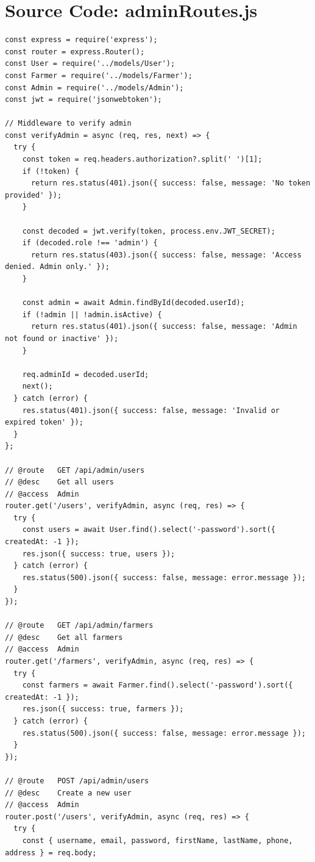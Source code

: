 \documentclass[12pt,a4paper]{report}
\begin{document}
\clearpage
\section{Source Code: adminRoutes.js}
\begin{lstlisting}
const express = require('express');
const router = express.Router();
const User = require('../models/User');
const Farmer = require('../models/Farmer');
const Admin = require('../models/Admin');
const jwt = require('jsonwebtoken');

// Middleware to verify admin
const verifyAdmin = async (req, res, next) => {
  try {
    const token = req.headers.authorization?.split(' ')[1];
    if (!token) {
      return res.status(401).json({ success: false, message: 'No token provided' });
    }

    const decoded = jwt.verify(token, process.env.JWT_SECRET);
    if (decoded.role !== 'admin') {
      return res.status(403).json({ success: false, message: 'Access denied. Admin only.' });
    }

    const admin = await Admin.findById(decoded.userId);
    if (!admin || !admin.isActive) {
      return res.status(401).json({ success: false, message: 'Admin not found or inactive' });
    }

    req.adminId = decoded.userId;
    next();
  } catch (error) {
    res.status(401).json({ success: false, message: 'Invalid or expired token' });
  }
};

// @route   GET /api/admin/users
// @desc    Get all users
// @access  Admin
router.get('/users', verifyAdmin, async (req, res) => {
  try {
    const users = await User.find().select('-password').sort({ createdAt: -1 });
    res.json({ success: true, users });
  } catch (error) {
    res.status(500).json({ success: false, message: error.message });
  }
});

// @route   GET /api/admin/farmers
// @desc    Get all farmers
// @access  Admin
router.get('/farmers', verifyAdmin, async (req, res) => {
  try {
    const farmers = await Farmer.find().select('-password').sort({ createdAt: -1 });
    res.json({ success: true, farmers });
  } catch (error) {
    res.status(500).json({ success: false, message: error.message });
  }
});

// @route   POST /api/admin/users
// @desc    Create a new user
// @access  Admin
router.post('/users', verifyAdmin, async (req, res) => {
  try {
    const { username, email, password, firstName, lastName, phone, address } = req.body;


\end{lstlisting}
\end{document}
